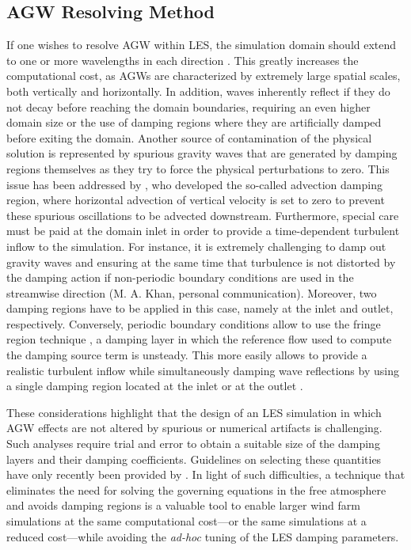 \subsection{AGW Resolving Method}
\label{subsec:agwResolvingMethod}
If one wishes to resolve AGW within LES, the simulation domain should extend to one or more wavelengths in each direction \citep{KlempLilly1978,AllaertsMeyers2019,StipaEtAl2023b,LanzilaoMayers2023}. This greatly increases the computational cost, as AGWs are characterized by extremely large spatial scales, both vertically and horizontally. In addition, waves inherently reflect if they do not decay before reaching the domain boundaries, requiring an even higher domain size or the use of damping regions where they are artificially damped before exiting the domain. Another source of contamination of the physical solution is represented by spurious gravity waves that are generated by damping regions themselves as they try to force the physical perturbations to zero. This issue has been addressed by \cite{LanzilaoMeyers2022a}, who developed the so-called advection damping region, where horizontal advection of vertical velocity is set to zero to prevent these spurious oscillations to be advected downstream. Furthermore, special care must be paid at the domain inlet in order to provide a time-dependent turbulent inflow to the simulation. For instance, it is extremely challenging to damp out gravity waves and ensuring at the same time that turbulence is not distorted by the damping action if non-periodic boundary conditions are used in the streamwise direction (M. A. Khan, personal communication). Moreover, two damping regions have to be applied in this case, namely at the inlet and outlet, respectively. Conversely, periodic boundary conditions allow to use the fringe region technique \citep{InoueEtAl2014}, a damping layer in which the reference flow used to compute the damping source term is unsteady. This more easily allows to provide a realistic turbulent inflow while simultaneously damping wave reflections by using a single damping region located at the inlet \citep{StipaEtAl2023} or at the outlet \cite{LanzilaoMeyers2022a,LanzilaoMeyers2022b}. 

These considerations highlight that the design of an LES simulation in which AGW effects are not altered by spurious or numerical artifacts is challenging. Such analyses require trial and error to obtain a suitable size of the damping layers and their damping coefficients. Guidelines on selecting these quantities have only recently been provided by \cite{LanzilaoMeyers2022a}. In light of such difficulties, a technique that eliminates the need for solving the governing equations in the free atmosphere and avoids damping regions is a valuable tool to enable larger wind farm simulations at the same computational cost---or the same simulations at a reduced cost---while avoiding the \textit{ad-hoc} tuning of the LES damping parameters. 

